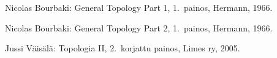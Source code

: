 \documentclass[12pt,a4paper,leqno]{report}
\theoremstyle{plain}
\newtheorem{lause}[equation]{Lause}
\newtheorem{lem}[equation]{Lemma}
\newtheorem{kor}[equation]{Korollaari}
\theoremstyle{definition}
\newtheorem{maar}[equation]{Määritelmä}
\newtheorem{esim}[equation]{Esimerkki}
\theoremstyle{remark}
\newtheorem{huom}[equation]{Huomautus}
\begin{document}
\begin{thebibliography}{9}

Nicolas Bourbaki: General Topology Part 1, 1.\ painos, Hermann, 1966.

Nicolas Bourbaki: General Topology Part 2, 1.\ painos, Hermann, 1966.

%
%
Jussi Väisälä: Topologia II, 2.\ korjattu painos, Limes ry, 2005.



\end{thebibliography}
\end{document}
